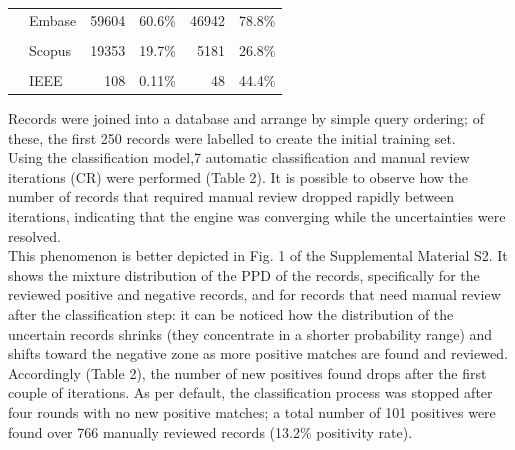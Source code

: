 \documentclass{article}
\begin{document}
\begin{table}[!h]
{\begin{tabular}[t]{llrlrl}
 & Embase & 59604 & 60.6\% & 46942 & 78.8\%\\
\cellcolor{gray!6}{} & \cellcolor{gray!6}{Pubmed} & \cellcolor{gray!6}{37278} & \cellcolor{gray!6}{37.9\%} & \cellcolor{gray!6}{21371} & \cellcolor{gray!6}{57.3\%}\\
\addlinespace
 & Scopus & 19353 & 19.7\% & 5181 & 26.8\%\\
\cellcolor{gray!6}{} & \cellcolor{gray!6}{WOS} & \cellcolor{gray!6}{14367} & \cellcolor{gray!6}{14.6\%} & \cellcolor{gray!6}{3175} & \cellcolor{gray!6}{22.1\%}\\
 & IEEE & 108 & 0.11\% & 48 & 44.4\%\\
\bottomrule
\end{tabular}}
\end{table}

Records were joined into a database and arrange by simple query
ordering; of these, the first 250 records were labelled to create the
initial training set.\\
Using the classification model,7 automatic classification and manual
review iterations (CR) were performed (Table 2). It is possible to
observe how the number of records that required manual review dropped
rapidly between iterations, indicating that the engine was converging
while the uncertainties were resolved.\\
This phenomenon is better depicted in Fig. 1 of the Supplemental
Material S2. It shows the mixture distribution of the PPD of the
records, specifically for the reviewed positive and negative records,
and for records that need manual review after the classification step:
it can be noticed how the distribution of the uncertain records shrinks
(they concentrate in a shorter probability range) and shifts toward the
negative zone as more positive matches are found and reviewed.
Accordingly (Table 2), the number of new positives found drops after the
first couple of iterations. As per default, the classification process
was stopped after four rounds with no new positive matches; a total
number of 101 positives were found over 766 manually reviewed records
(13.2\% positivity rate).\\
\end{document}
